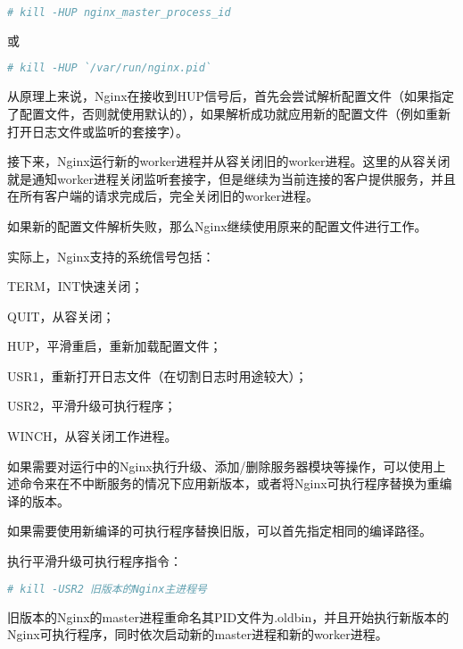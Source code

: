 \begin{lstlisting}[language=bash]
# kill -HUP nginx_master_process_id
\end{lstlisting}

或

\begin{lstlisting}[language=bash]
# kill -HUP `/var/run/nginx.pid`
\end{lstlisting}

从原理上来说，Nginx在接收到HUP信号后，首先会尝试解析配置文件（如果指定了配置文件，否则就使用默认的），如果解析成功就应用新的配置文件（例如重新打开日志文件或监听的套接字）。

接下来，Nginx运行新的worker进程并从容关闭旧的worker进程。这里的从容关闭就是通知worker进程关闭监听套接字，但是继续为当前连接的客户提供服务，并且在所有客户端的请求完成后，完全关闭旧的worker进程。

如果新的配置文件解析失败，那么Nginx继续使用原来的配置文件进行工作。








实际上，Nginx支持的系统信号包括：

\begin{compactenum}
\item TERM，INT快速关闭；
\item QUIT，从容关闭；
\item HUP，平滑重启，重新加载配置文件；
\item USR1，重新打开日志文件（在切割日志时用途较大）；
\item USR2，平滑升级可执行程序；
\item WINCH，从容关闭工作进程。
\end{compactenum}


如果需要对运行中的Nginx执行升级、添加/删除服务器模块等操作，可以使用上述命令来在不中断服务的情况下应用新版本，或者将Nginx可执行程序替换为重编译的版本。

\begin{compactenum}
\item 如果需要使用新编译的可执行程序替换旧版，可以首先指定相同的编译路径。

\item 执行平滑升级可执行程序指令：

\begin{lstlisting}[language=bash]
# kill -USR2 旧版本的Nginx主进程号
\end{lstlisting}

\item 旧版本的Nginx的master进程重命名其PID文件为.oldbin，并且开始执行新版本的Nginx可执行程序，同时依次启动新的master进程和新的worker进程。

\end{compactenum}

